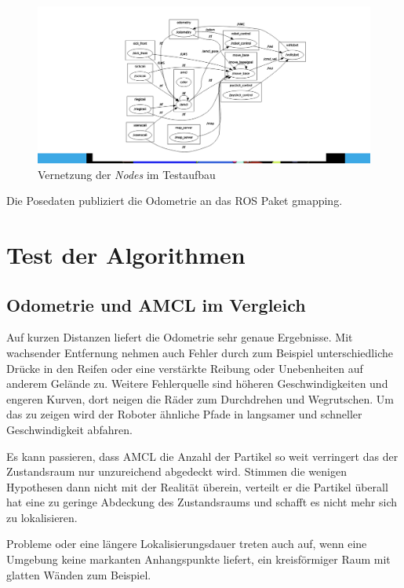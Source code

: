 \documentclass[11pt,a4paper]{article}
\begin{document}
{{	
	\begin{figure}[h]
		\includegraphics[trim=9cm 1cm 7cm 1cm , clip= true,width=\textwidth]{pictures/node_graph.png}
		\caption{Vernetzung der \textit{Nodes} im Testaufbau}
	\end{figure}
	
	
	
	 Die Posedaten publiziert die Odometrie an das ROS Paket gmapping.	
	
	
} 

\section{Test der Algorithmen} 
\subsection{Odometrie und AMCL im Vergleich}


Auf kurzen Distanzen liefert die Odometrie sehr genaue Ergebnisse. Mit wachsender Entfernung nehmen auch Fehler durch zum Beispiel unterschiedliche Dr\"ucke in den Reifen oder eine verst\"arkte Reibung oder Unebenheiten auf anderem Gel\"ande zu. Weitere Fehlerquelle sind h\"oheren Geschwindigkeiten und engeren Kurven, dort neigen die R\"ader zum Durchdrehen und Wegrutschen. Um das zu zeigen wird der Roboter \"ahnliche Pfade in langsamer und schneller Geschwindigkeit abfahren. 	

Es kann passieren, dass AMCL die Anzahl der Partikel so weit verringert das der Zustandsraum nur unzureichend abgedeckt wird. Stimmen die wenigen Hypothesen dann nicht mit der Realit\"at \"uberein, verteilt er die Partikel \"uberall hat eine zu geringe Abdeckung des Zustandsraums und schafft es nicht mehr sich zu lokalisieren.

Probleme oder eine l\"angere Lokalisierungsdauer treten auch auf, wenn eine Umgebung keine markanten Anhangspunkte liefert, ein kreisf\"ormiger Raum mit glatten W\"anden zum Beispiel. 

}
\end{document}
